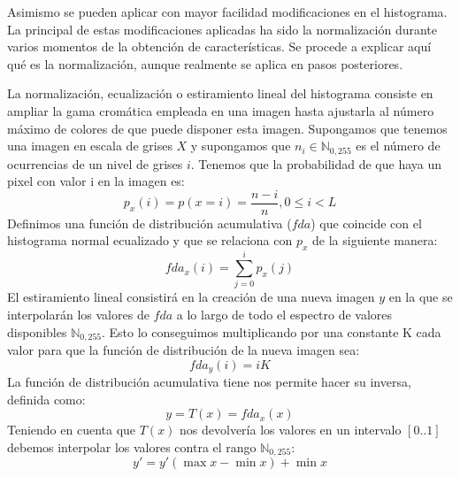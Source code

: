 Asimismo se pueden aplicar con mayor facilidad modificaciones en el histograma. La principal de estas modificaciones aplicadas ha sido la normalización durante varios momentos de la obtención de características. Se procede a explicar aquí qué es la normalización, aunque realmente se aplica en pasos posteriores\cite{histogramEqualization}.

La normalización, ecualización o estiramiento lineal del histograma consiste en ampliar la gama cromática empleada en una imagen hasta ajustarla al número máximo de colores de que puede disponer esta imagen. Supongamos que tenemos una imagen en escala de grises ${X}$ y supongamos que $n_{i} \in \mathbb{N}_{0,255}$ es el número de ocurrencias de un nivel de grises $i$. Tenemos que la probabilidad de que haya un pixel con valor i en la imagen es:
\[
	p_{x}(i) = p(x=i)=\frac{n-{i}}{n}, 0 \leq i < L
\]
Definimos una función de distribución acumulativa ($fda$) que coincide con el histograma normal ecualizado y que se relaciona con $p_{x}$ de la siguiente manera:
\[
	fda_{x}(i) = \sum_{j=0}^{i}p_{x}(j)
\]
El estiramiento lineal consistirá en la creación de una nueva imagen $y$ en la que se interpolarán los valores de $fda$ a lo largo de todo el espectro de valores disponibles $\mathbb{N}_{0,255}$. Esto lo conseguimos multiplicando por una constante K cada valor para que la función de distribución de la nueva imagen sea:
\[
	fda_{y}(i)=iK
\]
La función de distribución acumulativa tiene nos permite hacer su inversa, definida como:
\[
	y = T(x) = fda_{x}(x)
\]
Teniendo en cuenta que $T(x)$ nos devolvería los valores en un intervalo $\left[0..1\right]$ debemos interpolar los valores contra el rango $\mathbb{N}_{0,255}$:
\[
	y' = y' (\max{x} - \min {x}) + \min{x}
\]

